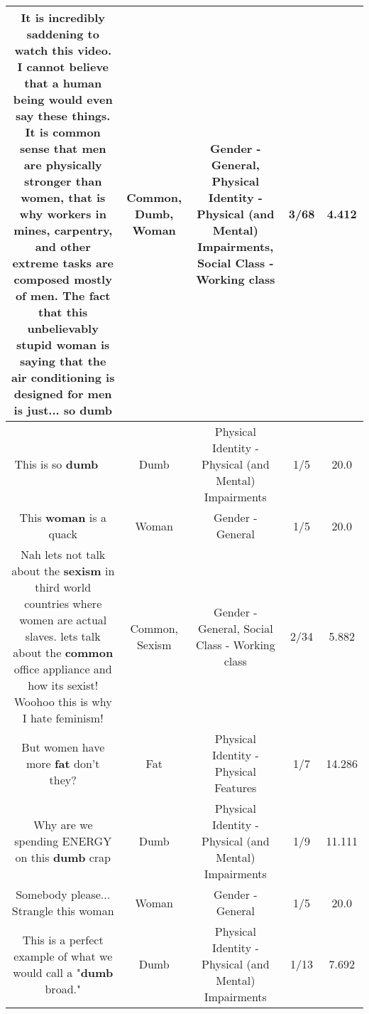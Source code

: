 \documentclass[11pt]{article}
\newlength\mylength
\begin{document}
\begin{center}
\begin{longtable}{|C{.65\mylength}|C{.30\mylength}|C{.12\mylength}|C{.12\mylength}|C{.12\mylength}|}
  \small It is incredibly saddening to watch this video. I cannot believe that a human being would even say these things. It is \textbf{common} sense that men are physically stronger than women, that is why workers in mines, carpentry, and other extreme tasks are composed mostly of men. The fact that this unbelievably stupid \textbf{woman} is saying that the air conditioning is designed for men is just... so dumb\normalsize   & Common, Dumb, Woman & Gender - General, Physical Identity - Physical (and Mental) Impairments, Social Class - Working class & 3/68 & 4.412 \\  \hline
  \small This is so \textbf{dumb} 🤦🏻‍♂️\normalsize   & Dumb & Physical Identity - Physical (and Mental) Impairments & 1/5 & 20.0 \\  \hline
  \small This \textbf{woman} is a quack\normalsize   & Woman & Gender - General & 1/5 & 20.0 \\  \hline
  \small Nah lets not talk about the \textbf{sexism} in third world countries where women are actual slaves. lets talk about the \textbf{common} office appliance and how its sexist! Woohoo this is why I hate feminism!\normalsize   & Common, Sexism & Gender - General, Social Class - Working class & 2/34 & 5.882 \\  \hline
  \small But women have more \textbf{fat} don't they?\normalsize   & Fat & Physical Identity - Physical Features & 1/7 & 14.286 \\  \hline
  \small Why are we spending ENERGY on this \textbf{dumb} crap\normalsize   & Dumb & Physical Identity - Physical (and Mental) Impairments & 1/9 & 11.111 \\  \hline
  \small Somebody please... Strangle this woman\normalsize   & Woman & Gender - General & 1/5 & 20.0 \\  \hline
  \small This is a perfect example of what we would call a "\textbf{dumb} broad."\normalsize   & Dumb & Physical Identity - Physical (and Mental) Impairments & 1/13 & 7.692 \\  \hline

\end{longtable}
\end{center}
\end{document}
